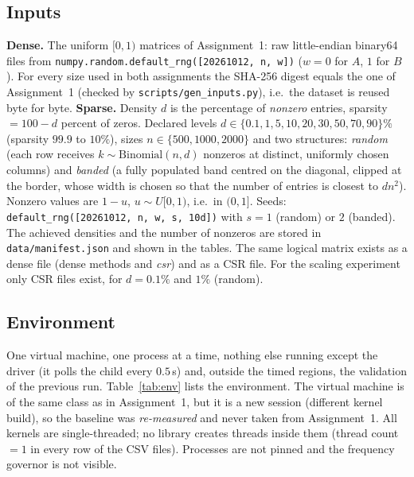 \subsection{Inputs}
\textbf{Dense.} The uniform $[0,1)$ matrices of Assignment~1: raw little-endian binary64 files from
\texttt{numpy.random.default\_rng([20261012, n, w])} ($w=0$ for $A$, $1$ for $B$). For every size used in both assignments the SHA-256 digest equals the one of
Assignment~1 (checked by \texttt{scripts/gen\_inputs.py}), i.e.\ the dataset is reused byte for byte.
\textbf{Sparse.} Density $d$ is the percentage of \emph{nonzero} entries, sparsity $=100-d$ percent of zeros. Declared levels
$d\in\{0.1,1,5,10,20,30,50,70,90\}\%$ (sparsity $99.9$ to $10\%$), sizes $n\in\{500,1000,2000\}$ and two structures:
\emph{random} (each row receives $k\sim\mathrm{Binomial}(n,d)$ nonzeros at distinct, uniformly chosen columns) and \emph{banded} (a fully populated band centred on the
diagonal, clipped at the border, whose width is chosen so that the number of entries is closest to $dn^2$). Nonzero values are $1-u$, $u\sim U[0,1)$,
i.e.\ in $(0,1]$. Seeds: \texttt{default\_rng([20261012, n, w, s, 10d])} with $s=1$ (random) or $2$ (banded). The achieved densities and the number of nonzeros are
stored in \texttt{data/manifest.json} and shown in the tables. The same logical matrix exists as a dense file (dense methods and \emph{csr}) and as a
CSR file. For the scaling experiment only CSR files exist, for $d=0.1\%$ and $1\%$ (random).

\subsection{Environment}
\label{sec:env}
One virtual machine, one process at a time, nothing else running except the driver (it polls the child every $0.5$\,s) and, outside the timed regions, the
validation of the previous run. Table~\ref{tab:env} lists the environment. The virtual machine is of the same class as in Assignment~1, but it is a new
session (different kernel build), so the baseline was \emph{re-measured} and never taken from Assignment~1. All kernels are single-threaded; no library creates threads inside them
(thread count $=1$ in every row of the CSV files). Processes are not pinned and the frequency governor is not visible.

\begin{table}[H]
\centering\small

\caption{Hardware and software environment.}
\label{tab:env}
\end{table}

